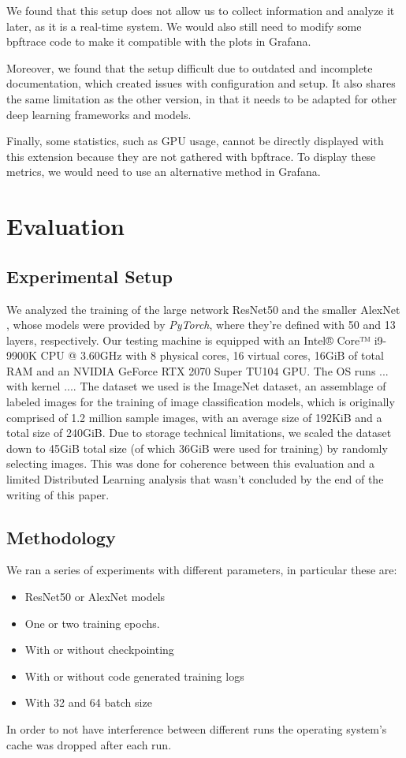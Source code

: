 \documentclass[conference]{IEEEtran}
\begin{document}
We found that this setup does not allow us to collect information and analyze it later, as it is a real-time system.
We would also still need to modify some bpftrace code to make it compatible with the plots in Grafana.

Moreover, we found that the setup difficult due to outdated and incomplete documentation, which created issues with configuration and setup.
It also shares the same limitation as the other version, in that it needs to be adapted for other deep learning frameworks and models.

Finally, some statistics, such as GPU usage, cannot be directly displayed with this extension because they are not gathered with bpftrace. To display these metrics, we would need to use an alternative method in Grafana.

\section{Evaluation}

\subsection{Experimental Setup}

We analyzed the training of the large network ResNet50 \cite{resnet50} and the smaller AlexNet \cite{alexnet}, whose models were
provided by \textit{PyTorch}, where they're defined with 50 and 13 layers, respectively. Our testing machine is equipped with an Intel® Core™ i9-9900K CPU @ 3.60GHz with
8 physical cores, 16 virtual cores, 16GiB of total RAM and an NVIDIA GeForce RTX 2070 Super TU104 GPU. The OS runs ... with kernel .... The dataset we used is the ImageNet \cite{imagenet} dataset, an assemblage of labeled images for the training of image classification models, which is originally comprised of 1.2 million sample images, with an average size of 192KiB and a total size of 240GiB. Due to storage technical limitations, we scaled the dataset down to 45GiB total size (of which 36GiB were used for training) by randomly selecting images. This was done for coherence between this evaluation and a limited Distributed Learning analysis that wasn't concluded by the end of the writing of this paper.

\subsection{Methodology}

We ran a series of experiments with different parameters, in particular these are:
\begin{itemize}
	\item ResNet50 or AlexNet models
	\item One or two training epochs.
	\item With or without checkpointing
	\item With or without code generated training logs
	\item With 32 and 64 batch size
\end{itemize}
In order to not have interference between different runs the operating system's cache was dropped after each run.
\end{document}
